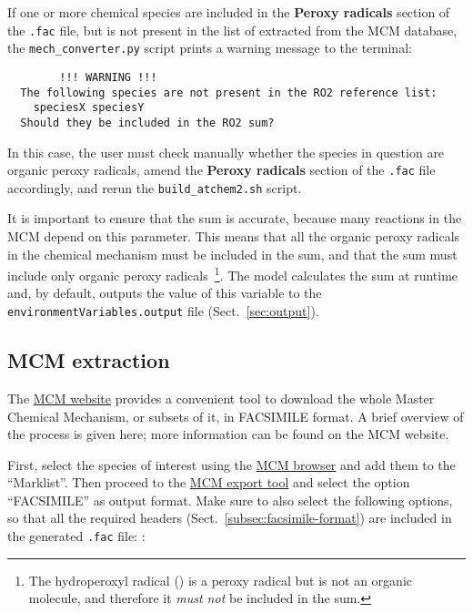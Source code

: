 If one or more chemical species are included in the \textbf{Peroxy radicals}
section of the \texttt{.fac} file, but is not present in the list of 
extracted from the MCM database, the \texttt{mech\_converter.py} script
prints a warning message to the terminal:

\begin{verbatim}
        !!! WARNING !!!
  The following species are not present in the RO2 reference list:
    speciesX speciesY
  Should they be included in the RO2 sum?
\end{verbatim}

In this case, the user must check manually whether the species in
question are organic peroxy radicals, amend the \textbf{Peroxy radicals}
section of the \texttt{.fac} file accordingly, and rerun the
\texttt{build\_atchem2.sh} script.

It is important to ensure that the  sum is accurate, because
many reactions in the MCM depend on this parameter. This means that
all the organic peroxy radicals in the chemical mechanism must be
included in the  sum, and that the  sum must include
only organic peroxy radicals~\footnote{The hydroperoxyl radical
  () is a peroxy radical but is not an organic molecule, and
  therefore it \emph{must not} be included in the  sum.}. The
model calculates the  sum at runtime and, by default, outputs
the value of this variable to the \texttt{environmentVariables.output}
file (Sect.~\ref{sec:output}).

\subsection{MCM extraction} \label{subsec:mcm-extraction}

The \href{https://mcm.york.ac.uk/MCM/}{MCM website} provides a
convenient tool to download the whole Master Chemical Mechanism, or
subsets of it, in FACSIMILE format. A brief overview of the process is
given here; more information can be found on the MCM website.

First, select the species of interest using the
\href{https://mcm.york.ac.uk/MCM/browse}{MCM browser} and add them to
the ``Marklist''. Then proceed to the
\href{https://mcm.york.ac.uk/MCM/export}{MCM export tool} and select
the option ``FACSIMILE'' as output format. Make sure to also select
the following options, so that all the required headers
(Sect.~\ref{subsec:facsimile-format}) are included in the generated
\texttt{.fac} file: :


